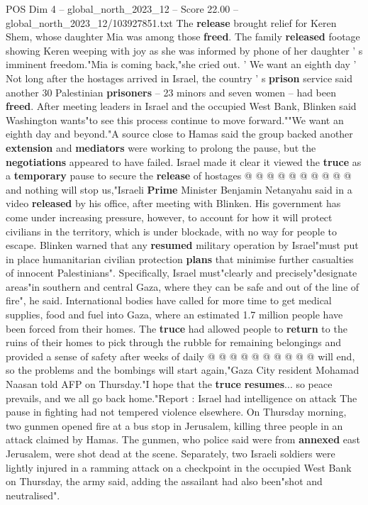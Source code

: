 \begin{textsample}{POS Dim 4 – global\_north\_2023\_12 – Score 22.00 – global\_north\_2023\_12/103927851.txt}
The \textbf{release} brought relief for Keren Shem, whose daughter Mia was among those \textbf{freed}.
The family \textbf{released} footage showing Keren weeping with joy as she was informed by phone of her daughter ' s imminent freedom."Mia is coming back,"she cried out. ' We want an eighth day ' Not long after the hostages arrived in Israel, the country ' s \textbf{prison} service said another 30 Palestinian \textbf{prisoners} -- 23 minors and seven women -- had been \textbf{freed}.
After meeting leaders in Israel and the occupied West Bank, Blinken said Washington wants"to see this process continue to move forward.""We want an eighth day and beyond."A source close to Hamas said the group backed another \textbf{extension} and \textbf{mediators} were working to prolong the pause, but the \textbf{negotiations} appeared to have failed.
Israel made it clear it viewed the \textbf{truce} as a \textbf{temporary} pause to secure the \textbf{release} of hostages @ @ @ @ @ @ @ @ @ @ and nothing will stop us,"Israeli \textbf{Prime} Minister Benjamin Netanyahu said in a video \textbf{released} by his office, after meeting with Blinken.
His government has come under increasing pressure, however, to account for how it will protect civilians in the territory, which is under blockade, with no way for people to escape.
Blinken warned that any \textbf{resumed} military operation by Israel"must put in place humanitarian civilian protection \textbf{plans} that minimise further casualties of innocent Palestinians".
Specifically, Israel must"clearly and precisely"designate areas"in southern and central Gaza, where they can be safe and out of the line of fire", he said.
International bodies have called for more time to get medical supplies, food and fuel into Gaza, where an estimated 1.7 million people have been forced from their homes.
The \textbf{truce} had allowed people to \textbf{return} to the ruins of their homes to pick through the rubble for remaining belongings and provided a sense of safety after weeks of daily @ @ @ @ @ @ @ @ @ @ will end, so the problems and the bombings will start again,"Gaza City resident Mohamad Naasan told AFP on Thursday."I hope that the \textbf{truce} \textbf{resumes}... so peace prevails, and we all go back home."Report : Israel had intelligence on attack The pause in fighting had not tempered violence elsewhere.
On Thursday morning, two gunmen opened fire at a bus stop in Jerusalem, killing three people in an attack claimed by Hamas.
The gunmen, who police said were from \textbf{annexed} east Jerusalem, were shot dead at the scene.
Separately, two Israeli soldiers were lightly injured in a ramming attack on a checkpoint in the occupied West Bank on Thursday, the army said, adding the assailant had also been"shot and neutralised".

\end{textsample}
